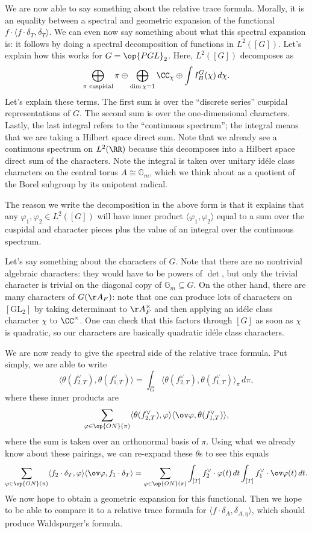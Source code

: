 \documentclass[../notes.tex]{subfiles}
\begin{document}
We are now able to say something about the relative trace formula. Morally, it is an equality between a spectral and geometric expansion of the functional $f\cdot\langle f\cdot\delta_T,\delta_T\rangle$. We can even now say something about what this spectral expansion is: it follows by doing a spectral decomposition of functions in $L^2([G])$. Let's explain how this works for $G=\op{PGL}_2$. Here, $L^2([G])$ decomposes as
\[\bigoplus_{\pi\text{ cuspidal}}\pi\oplus\bigoplus_{\dim\chi=1}\CC_\chi\oplus\int I_B^G(\chi)\,d\chi.\]
Let's explain these terms. The first sum is over the ``discrete series'' cuspidal representations of $G$. The second sum is over the one-dimensional characters. Lastly, the last integral refers to the ``continuous spectrum''; the integral means that we are taking a Hilbert space direct sum. Note that we already see a continuous spectrum on $L^2(\RR)$ because this decomposes into a Hilbert space direct sum of the characters. Note the integral is taken over unitary id\'ele class characters on the central torus $A\cong\mathbb G_m$, which we think about as a quotient of the Borel subgroup by its unipotent radical.
\begin{remark}
	The reason we write the decomposition in the above form is that it explains that any $\varphi_1,\varphi_2\in L^2([G])$ will have inner product $\langle\varphi_1,\varphi_2\rangle$ equal to a sum over the cuspidal and character pieces plus the value of an integral over the continuous spectrum. 
\end{remark}
Let's say something about the characters of $G$. Note that there are no nontrivial algebraic characters: they would have to be powers of $\det$, but only the trivial character is trivial on the diagonal copy of $\mathbb G_m\subseteq G$. On the other hand, there are many characters of $G(\AA_F)$: note that one can produce lots of characters on $[\mathrm{GL}_2]$ by taking determinant to $\AA_F^\times$ and then applying an id\'ele class character $\chi$ to $\CC^\times$. One can check that this factors through $[G]$ as soon as $\chi$ is quadratic, so our characters are basically quadratic id\'ele class characters.

We are now ready to give the spectral side of the relative trace formula. Put simply, we are able to write
\[\langle\theta(f_{2,T}^\lor),\theta(f_{1,T}^\lor)\rangle=\int_{\widehat G}\langle\theta(f_{2,T}^\lor),\theta(f_{1,T}^\lor)\rangle_\pi\,d\pi,\]
where these inner products are
\[\sum_{\varphi\in\op{ON}(\pi)}\langle\theta(f_{2,T}^\lor),\varphi\rangle\langle\ov\varphi,\theta(f_{1,T}^\lor)\rangle,\]
where the sum is taken over an orthonormal basis of $\pi$. Using what we already know about these pairings, we can re-expand these $\theta$s to see this equals
\[\sum_{\varphi\in\op{ON}(\pi)}\langle f_2\cdot\delta_T,\varphi\rangle\langle \ov\varphi,f_1\cdot\delta_T\rangle=\sum_{\varphi\in\op{ON}(\pi)}\int_{[T]}f_2^\lor\cdot\varphi(t)\,dt\int_{[T]}f_1^\lor\cdot\ov\varphi(t)\,dt.\]
We now hope to obtain a geometric expansion for this functional. Then we hope to be able to compare it to a relative trace formula for $\langle f\cdot\delta_A,\delta_{A,\eta}\rangle$, which should produce Waldspurger's formula.
\end{document}
